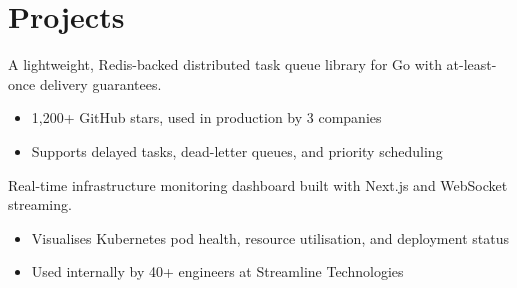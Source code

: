 
\section{Projects}



A lightweight, Redis-backed distributed task queue library for Go with at-least-once delivery guarantees.


\begin{itemize}

  \item 1,200+ GitHub stars, used in production by 3 companies

  \item Supports delayed tasks, dead-letter queues, and priority scheduling

\end{itemize}




Real-time infrastructure monitoring dashboard built with Next.js and WebSocket streaming.


\begin{itemize}

  \item Visualises Kubernetes pod health, resource utilisation, and deployment status

  \item Used internally by 40+ engineers at Streamline Technologies

\end{itemize}



